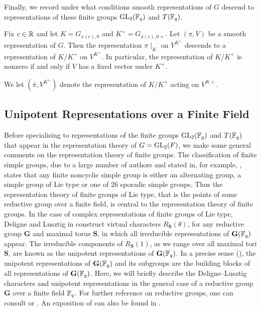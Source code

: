 Finally, we record under what conditions smooth representations of $G$ descend to representations of these finite groups $\mathrm{GL}_2(\mathbb{F}_q)$ and $T(\mathbb{F}_q)$.

\begin{lemma}
    Fix $c \in \mathbb{R}$ and let $K=G_{x(c),0}$ and $K^+ =G_{x(c),0+}$. Let $(\pi,V)$ be a smooth representation of $G$. Then the representation $\pi\mid_{K}$ on $V^{K^+}$ descends to a representation of $K/K^+$ on $V^{K^+}$. In particular, the representation of $K/K^+$ is nonzero if and only if $V$ has a fixed vector under $K^+$.
\end{lemma}

\begin{notn}
    We let $(\bar{\pi},V^{K^+})$ denote the representation of $K/K^+$ acting on $V^{K+}$.
\end{notn}


\subsection{Unipotent Representations over a Finite Field}

Before specialising to representations of the finite groups $\mathrm{GL}_2(\mathbb{F}_q)$ and $T(\mathbb{F}_q)$ that appear in the representation theory of $G=\mathrm{GL}_2(F)$, we make some general comments on the representation theory of finite groups. The classification of finite simple groups, due to a large number of authors and stated in, for example, \cite{Gor1}, states that any finite noncyclic simple group is either an alternating group, a simple group of Lie type or one of 26 sporadic simple groups. Thus the representation theory of finite groups of Lie type, that is the points of some reductive group over a finite field, is central to the representation theory of finite groups. In the case of complex representations of finite groups of Lie type, Deligne and Lusztig in \cite{DL1} construct virtual characters $R_{\mathbf S}(\theta)$, for any reductive group $\mathbf G$ and maximal torus $\mathbf S$, in which all irreducible representations of $\mathbf G(\mathbb{F}_q)$ appear. The irreducible components of $R_{\mathbf S}(1)$, as we range over all maximal tori $\mathbf S$, are known as the unipotent representations of $\mathbf G(\mathbb{F}_q)$. In a precise sense (\cite[Theorem 4.23]{Lus2}), the unipotent representations of $\mathbf G(\mathbb{F}_q)$ and its subgroups are the building blocks of all representations of $\mathbf G(\mathbb{F}_q)$. Here, we will briefly describe the Deligne--Lusztig characters and unipotent representations in the general case of a reductive group $\mathbf G$ over a finite field $\mathbb{F}_q$. For further reference on reductive groups, one can consult \cite[Chapter 1]{Car1} or \cite[Chapter 1]{GH1}. An exposition of \cite{DL1} can also be found in \cite{Car1}.

